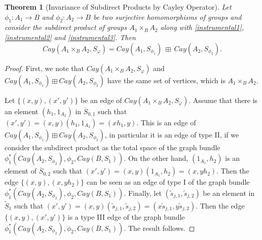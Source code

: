 \documentclass{amsart}
\newtheorem{thm}[theo]{Theorem}
\theoremstyle{definition}
\numberwithin{equation}{section}
\begin{document}
\begin{thm}[Invariance of Subdirect Products by Cayley Operator]\label{7thmaintheorem}
Let $\phi_1: A_1 \longrightarrow B$ and $\phi_2: A_2 \longrightarrow B$ be two surjective homomorphisms of groups and consider the subdirect product of groups $ A_1 \times_{B} A_2$ along with \eqref{instrumental1}, \eqref{instrumental2} and \eqref{instrumental3}. Then 
\begin{equation}
Cay(A_1 \times_{B} A_2, S_{\varphi}) = Cay(A_1,S_{\phi_1}) \ \boxplus  \ Cay(A_2,S_{\phi_2}).
\end{equation}
\end{thm}
\begin{proof}
First, we note that $Cay(A_1 \times_{B} A_2, S_{\varphi})$ and $Cay(A_1,S_{\phi_1}) \boxplus Cay(A_2,S_{\phi_2})$ have the same set of vertices, which is $A_1 \times_{B} A_2$. 



Let $\{(x,y),(x',y')\}$ be an edge of $Cay(A_1 \times_{B} A_2, S_{\varphi})$. Assume that there is an element $(h_1, 1_{A_2})$ in $\overline{S}_{0,1}$ such that $(x', y') = (x,y)(h_1,1_{A_2})=  (xh_1,y)$. This is an edge of $Cay(A_1,S_{\phi_1}) \boxplus Cay(A_2,S_{\phi_2})$, in particular it is an edge of type II, if we consider the subdirect product as the total space of the graph bundle $\phi_1^*(Cay(A_2,S_{\phi_2}), \phi_2, Cay(B,S_1))$. On the other hand,  $(1_{A_1}, h_2)$ is an element of $\overline{S}_{0,2}$ such that $(x', y') = (x,y)(1_{A_1}, h_2) =  (x,yh_2)$. Then the edge $\{(x,y), (x,yh_2)\}$ can be seen as an edge of type I of the graph bundle $\phi_1^*(Cay(A_2,S_{\phi_2}), \phi_2, Cay(B,S_1))$. 
Finally, let $(\widetilde{s}_{j,1},\widetilde{s}_{j,2})$ be an element in $\widetilde{S}_1$ such that $(x', y') = (x,y)(\widetilde{s}_{j,1},\widetilde{s}_{j,2}) =  (x\widetilde{s}_{j,1},y\widetilde{s}_{j,2})$. Then the edge $\{(x,y),(x', y')\}$ is a type III edge of the graph bundle $\phi_1^*(Cay(A_2,S_{\phi_2}), \phi_2, Cay(B,S_1))$. The result follows.
\end{proof}
\end{document}
